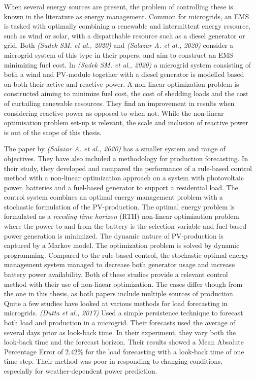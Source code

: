 When several energy sources are present, the problem of controlling these is known in the literature as energy management. Common for microgrids, an EMS is tasked with optimally combining a renewable and intermittent energy resource, such as wind or solar, with a dispatchable resource such as a diesel generator or grid. Both \textit{(Sadek SM. et al., 2020)} and \textit{(Salazar A. et al., 2020)} consider a microgrid system of this type in their papers, and aim to construct an EMS minimizing fuel cost. In \textit{(Sadek SM. et al., 2020)} a microgrid system consisting of both a wind and PV-module together with a diesel generator is modelled based on both their active and reactive power. A non-linear optimization problem is constructed aiming to minimize fuel cost, the cost of shedding loads and the cost of curtailing renewable resources. They find an improvement in results when considering reactive power as opposed to when not. While the non-linear optimisation problem set-up is relevant, the scale and inclusion of reactive power is out of the scope of this thesis.\cite{Sadek2020-wl}

The paper by \textit{(Salazar A. et al., 2020)} has a smaller system and range of objectives. They have also included a methodology for production forecasting. In their study, they developed and compared the performance of a rule-based control method with a non-linear optimization approach on a system with photovoltaic power, batteries and a fuel-based generator to support a residential load. The control system combines an optimal energy management problem with a stochastic formulation of the PV-production. The optimal energy problem is formulated as a \textit{receding time horizon} (RTH) non-linear optimization problem where the power to and from the battery is the selection variable and fuel-based power generation is minimized. The dynamic nature of PV-production is captured by a Markov model. The optimization problem is solved by dynamic programming. Compared to the rule-based control, the stochastic optimal energy management system managed to decrease both generator usage and increase battery power availability.\cite{Salazar2020-al}
Both of these studies provide a relevant control method with their use of non-linear optimization. The cases differ though from the one in this thesis, as both papers include multiple sources of production.\\  

Quite a few studies have looked at various methods for load forecasting in microgrids. \textit{(Dutta et al., 2017)} Used a simple persistence technique to forecast both load and production in a microgrid. Their forecasts used the average of several days prior as look-back time. In their experiment, they vary both the look-back time and the forecast horizon. Their results showed a Mean Absolute Percentage Error of $2.42\%$ for the load forecasting with a look-back time of one time-step. Their method was poor in responding to changing conditions, especially for weather-dependent power prediction.\cite{Dutta2017-oi}\\


